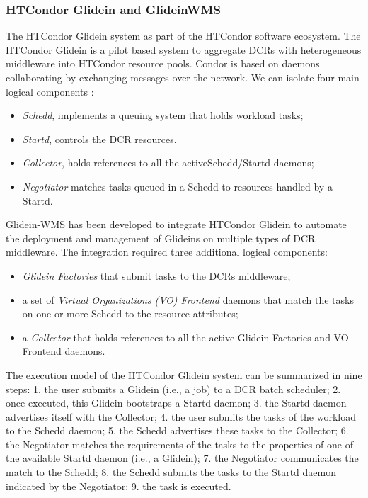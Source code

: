 \subsubsection{HTCondor Glidein and GlideinWMS}
The HTCondor Glidein system  as part of the HTCondor software ecosystem. The HTCondor Glidein is a pilot based system to aggregate DCRs with heterogeneous middleware into HTCondor resource pools.
Condor is based on daemons collaborating by exchanging messages over the network. We can isolate four main logical components \cite{Sfiligoi2008}:
\begin{itemize}
\item \emph{Schedd}, implements a queuing system that holds workload tasks;
\item \emph{Startd}, controls the DCR resources. 
\item \emph{Collector}, holds references to all the activeSchedd/Startd daemons; 
\item \emph{Negotiator} matches tasks queued in a Schedd to resources handled by a Startd.
\end{itemize}
Glidein-WMS has been developed to integrate HTCondor Glidein to  automate the deployment and management of Glideins on multiple types of DCR middleware. 
The integration required three additional logical components: 
\begin{itemize}
\item \emph{Glidein Factories} that submit tasks to the DCRs middleware;
\item a set of \emph{Virtual Organizations (VO) Frontend} daemons that match the tasks on one or more Schedd to the resource attributes;
\item a \emph{Collector} that holds references to all the active Glidein Factories and VO Frontend daemons. 
\end{itemize}

 The execution model of the HTCondor Glidein system can be summarized in nine steps: 1. the user submits a Glidein (i.e., a job) to a DCR batch scheduler; 2. once executed, this Glidein bootstraps a Startd daemon; 3. the Startd daemon advertises itself with the Collector; 4. the user submits the tasks of the workload to the Schedd daemon; 5. the Schedd advertises these tasks to the Collector; 6. the Negotiator matches the requirements of the tasks to the properties of one of the available Startd daemon (i.e., a Glidein); 7. the Negotiator communicates the match to the Schedd; 8. the Schedd submits the tasks to the Startd daemon indicated by
the Negotiator; 9. the task is executed.

